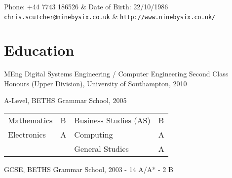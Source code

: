 \documentclass[overlapped,line,letterpaper]{res}
\begin{document}

\setlength{\leftmargini}{0em}
\setlength{\leftmargin}{1.5cm}
\setlength{\rightmargin}{1.5cm}
\setlength{\textheight}{800pt}
\setlength{\voffset}{-0.5in}
\renewcommand{\labelitemi}{}

\renewcommand{\namefont}{\large\textbf}



\begin{resume}

\begin{ncolumn}{2}
  Phone: +44 7743 186526                & Date of Birth: 22/10/1986 \\
  {\tt chris.scutcher@ninebysix.co.uk}  & {\tt \verb+http://www.ninebysix.co.uk/+}
\end{ncolumn}


\section{\bf Education}
MEng Digital Systems Engineering / Computer Engineering Second Class Honours (Upper Division), University of
Southampton, 2010

A-Level, BETHS Grammar School, 2005						\\
\hspace*{1cm}
\begin{tabulary}{\textwidth}{p{4cm}p{0.5cm}p{4cm}p{0.5cm}}
Mathematics	&	B	&	Business Studies (AS)	&	B	\\
Electronics	&	A	&	Computing		&	A	\\
		&		&	General Studies		&	A	\\
\end{tabulary}

GCSE, BETHS Grammar School, 2003	- 14 A/A* - 2  B




\end{resume}
\end{document}
